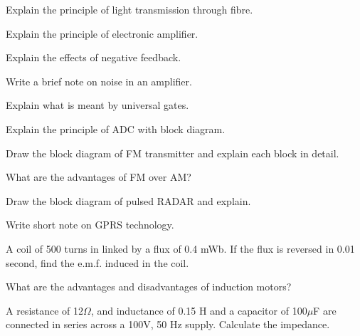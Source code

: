 \item Explain the principle of light transmission through fibre.

\partC

\item \iitem \iitem Explain the principle of electronic amplifier.  

\item Explain the effects of negative feedback. 

\item Write a brief note on noise in an amplifier. 
\ene

\Or

\item \iitem Explain what is meant by universal gates. 

\item Explain the principle of ADC with block diagram. 

\ene

\ene

\item \iitem \iitem Draw the block diagram of FM transmitter and explain each block in detail. 


\item What are the advantages of FM over AM? 

\ene


\Or

\item \iitem Draw the block diagram of pulsed RADAR and explain. 

\item Write short note on GPRS technology. 

\ene
\ene
\ene


\newpage





\sub{\subj}

\maxtime


\sectionC

\partA


\iitem A coil of 500 turns in linked by a flux of 0.4 mWb. If the flux is reversed in 0.01 second, find the
e.m.f. induced in the coil. 

\item What are the advantages and disadvantages of induction motors? 


\item A resistance of 12$\Omega$, and inductance of 0.15 H and a capacitor of 100$\mu$F are connected in 
  series across a 100V, 50 Hz supply. Calculate the impedance. \marka

